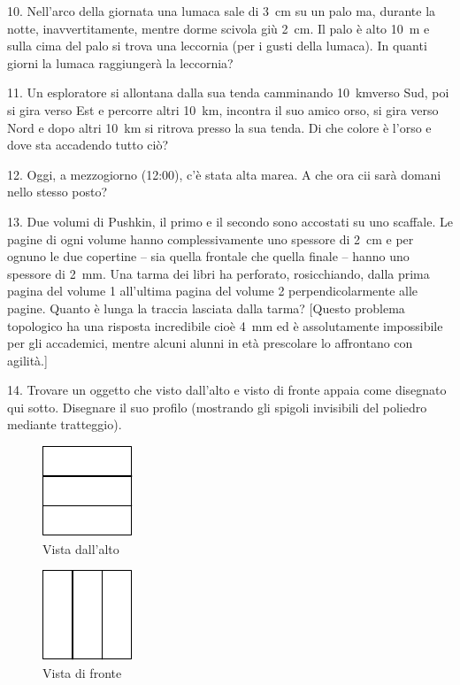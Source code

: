 \begin{problem}{10.}
	Nell’arco della giornata una lumaca sale di \SI{3}{\cm} su un palo ma, durante la notte, inavvertitamente, mentre dorme scivola giù \SI{2}{\cm}. Il palo è alto \SI{10}{\metre}
e sulla cima del palo si trova una leccornia (per i gusti della lumaca). In quanti giorni la lumaca raggiungerà la leccornia?
\end{problem}

\begin{problem}{11.}
	Un esploratore si allontana dalla sua tenda camminando \SI{10}{\km}verso Sud, poi si gira verso Est e percorre altri \SI{10}{\km},
	incontra il suo amico orso, si gira verso Nord e dopo altri \SI{10}{\km} si ritrova presso la sua tenda. Di che colore è l’orso e dove sta accadendo tutto ciò?
\end{problem}

\begin{problem}{12.}
	Oggi, a mezzogiorno (12:00), c’è stata alta marea. A che ora cii sarà domani nello stesso posto?
\end{problem}

\begin{problem}{13.}
	Due volumi di Pushkin, il primo e il secondo sono accostati su uno scaffale. Le pagine di ogni volume hanno complessivamente uno spessore di \SI{2}{\cm} e per ognuno le due copertine -- sia quella frontale che quella finale -- hanno uno spessore di  \SI{2}{\mm}. Una tarma dei libri ha perforato, rosicchiando, dalla prima pagina del volume 1 all’ultima pagina del volume 2 perpendicolarmente alle pagine. Quanto è lunga la traccia lasciata dalla tarma? [Questo problema topologico ha una risposta incredibile cioè \SI{4}{\mm} ed è assolutamente impossibile per gli accademici, mentre alcuni alunni in età prescolare lo affrontano con agilità.]
\end{problem}

\begin{problem}{14.}
	Trovare un oggetto che visto dall’alto e visto di fronte appaia come disegnato qui sotto. Disegnare il suo profilo (mostrando gli spigoli invisibili del poliedro mediante tratteggio).
	\begin{figure}
		\footnotesize
		\null\hfill
		\parbox{0.2\linewidth}{\centering\includegraphics{resources/taskbook-99}\\Vista dall'alto}
		\hfill
		\parbox{0.2\linewidth}{\centering\includegraphics{resources/taskbook-98}\\Vista di fronte}
		\hfill\null
	\end{figure}
\end{problem}

